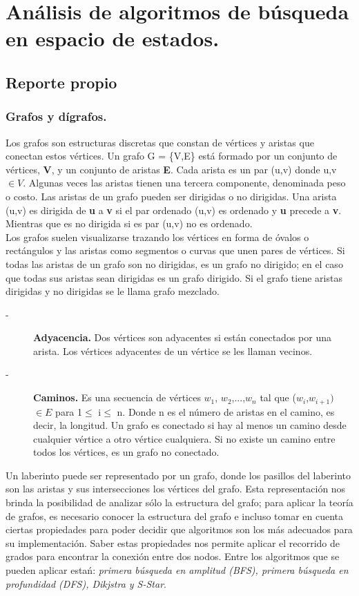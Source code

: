 \section*{Análisis de algoritmos de búsqueda en espacio de estados.}
\subsection*{Reporte propio}
	\subsubsection*{Grafos y dígrafos.}
	\noindent Los grafos son estructuras discretas que constan de vértices y aristas que conectan estos vértices.
	Un grafo G = \{V,E\} está formado por un conjunto de vértices, \textbf{V},  y un conjunto de aristas \textbf{E}. Cada arista es un par (u,v) donde u,v $\in V$. Algunas veces las aristas tienen una tercera componente, denominada peso o costo. Las aristas de un grafo pueden ser dirigidas o no dirigidas. Una arista (u,v) es dirigida de \textbf{u} a \textbf{v} si el par ordenado (u,v) es ordenado y \textbf{u} precede a \textbf{v}. Mientras que es no dirigida si es par (u,v) no es ordenado.\\
	\noindent Los grafos suelen  visualizarse trazando los vértices en forma de óvalos o rectángulos y las aristas como segmentos o curvas que unen pares de vértices. Si todas las aristas de un grafo son no dirigidas, es un grafo no dirigido; en el caso que todas sus aristas sean dirigidas es un grafo dirigido. Si el grafo tiene aristas dirigidas y no dirigidas se le llama grafo mezclado.
	\begin{description}
	    \item[-] \textbf{Adyacencia.} Dos vértices son adyacentes si están conectados por una arista. Los vértices adyacentes de un vértice se les llaman vecinos.
	    \item[-] \textbf{Caminos.} Es una secuencia de vértices $w_{1}$, $w_{2}$,...,$w_{n}$ tal que ($w_{i}$,$w_{i+1})$ $ \in E$ para 1$\le$ i$\le$ n. Donde n es el número de aristas en el camino, es decir, la longitud. Un grafo es conectado si hay al menos un camino desde cualquier vértice a otro vértice cualquiera. Si no existe un camino entre todos los vértices, es un grafo no conectado.
	\end{description}
	\noindent Un laberinto puede ser representado por un grafo, donde los pasillos del laberinto son las aristas y sus intersecciones los vértices del grafo. Esta representación nos brinda la posibilidad de analizar sólo la estructura del grafo; para aplicar la teoría de grafos, es necesario conocer la estructura del grafo e incluso tomar en cuenta ciertas propiedades para poder decidir que algoritmos son los más adecuados para su implementación. Saber estas propiedades nos permite aplicar el recorrido de grados para encontrar la conexión entre dos nodos. Entre los algoritmos que se pueden aplicar estań: \textit{primera búsqueda en amplitud (BFS), primera búsqueda en profundidad (DFS), Dikjstra y S-Star}.\\
	
